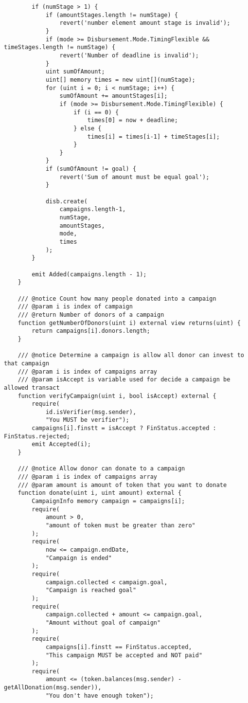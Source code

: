 \documentclass[../main-report.tex]{subfiles}
\begin{document}
\begin{lstlisting}
        if (numStage > 1) {
            if (amountStages.length != numStage) {
                revert('number element amount stage is invalid');
            }
            if (mode >= Disbursement.Mode.TimingFlexible && timeStages.length != numStage) {
                revert('Number of deadline is invalid');
            }
            uint sumOfAmount;
            uint[] memory times = new uint[](numStage);
            for (uint i = 0; i < numStage; i++) {
                sumOfAmount += amountStages[i];
                if (mode >= Disbursement.Mode.TimingFlexible) {
                    if (i == 0) {
                        times[0] = now + deadline;
                    } else {
                        times[i] = times[i-1] + timeStages[i];
                    }
                }
            }
            if (sumOfAmount != goal) {
                revert('Sum of amount must be equal goal');
            }

            disb.create(
                campaigns.length-1,
                numStage,
                amountStages,
                mode,
                times
            );
        }

        emit Added(campaigns.length - 1);
    }

    /// @notice Count how many people donated into a campaign
    /// @param i is index of campaign
    /// @return Number of donors of a campaign
    function getNumberOfDonors(uint i) external view returns(uint) {
        return campaigns[i].donors.length;
    }

    /// @notice Determine a campaign is allow all donor can invest to that campaign
    /// @param i is index of campaigns array
    /// @param isAccept is variable used for decide a campaign be allowed transact
    function verifyCampaign(uint i, bool isAccept) external {
        require(
            id.isVerifier(msg.sender),
            "You MUST be verifier");
        campaigns[i].finstt = isAccept ? FinStatus.accepted : FinStatus.rejected;
        emit Accepted(i);
    }

    /// @notice Allow donor can donate to a campaign
    /// @param i is index of campaigns array
    /// @param amount is amount of token that you want to donate
    function donate(uint i, uint amount) external {
        CampaignInfo memory campaign = campaigns[i];
        require(
            amount > 0,
            "amount of token must be greater than zero"
        );
        require(
            now <= campaign.endDate,
            "Campaign is ended"
        );
        require(
            campaign.collected < campaign.goal,
            "Campaign is reached goal"
        );
        require(
            campaign.collected + amount <= campaign.goal,
            "Amount without goal of campaign"
        );
        require(
            campaigns[i].finstt == FinStatus.accepted,
            "This campaign MUST be accepted and NOT paid"
        );
        require(
            amount <= (token.balances(msg.sender) - getAllDonation(msg.sender)),
            "You don't have enough token");


\end{lstlisting}
\end{document}
